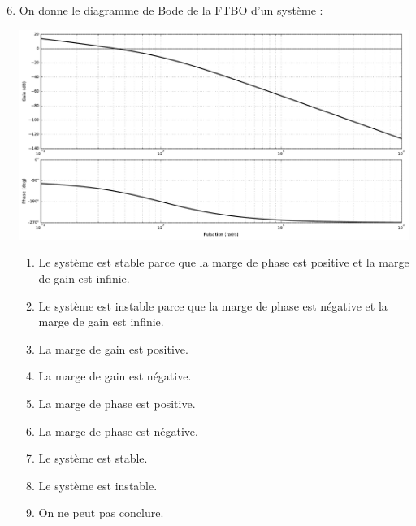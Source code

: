 \documentclass[10pt,fleqn]{article} %
\begin{document}
\begin{multicols}{2}
\begin{enumerate}
\setcounter{enumi}{5}
\item On donne le diagramme de Bode de la FTBO d'un système : 
\begin{center}
\includegraphics[width=\linewidth]{images/img_04}
\end{center}
\begin{enumerate}
\item Le système est stable parce que la marge de phase est positive et la marge de gain est infinie.
\item Le système est instable parce que la marge de phase est négative et la marge de gain est infinie.
\item La marge de gain est positive. %
\item La marge de gain est négative. %
\item La marge de phase est positive. %
\item La marge de phase est négative.
\item Le système est stable. %
\item Le système est instable.
\item On ne peut pas conclure. %
\end{enumerate}
\end{enumerate}

\fi

\end{multicols}
\end{document}
